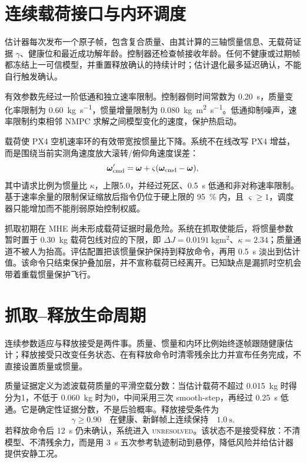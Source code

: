 \documentclass[11pt,UTF8,fontset=none]{ctexrep}
\providecommand{\dJ}{\Delta J}
\begin{document}
\section{连续载荷接口与内环调度}

估计器每次发布一个原子帧，包含复合质量、由其计算的三轴惯量信息、无载荷证据 $\gamma$、健康位和最近成功解年龄。控制器还检查帧接收年龄。任何不健康或过期帧都冻结上一可信模型，并重置释放确认的持续计时；估计退化最多延迟确认，不能自行触发确认。

有效参数先经过一阶低通和独立速率限制。控制器侧时间常数为 \SI{0.20}{\second}，质量变化率限制为 \SI{0.60}{\kg\per\second}，惯量增量限制为 \SI{0.080}{\kg\meter\squared\per\second}。低通抑制噪声，速率限制约束相邻 NMPC 求解之间模型变化的速度，保护热启动。

载荷使 PX4 空机速率环的有效带宽按惯量比下降。系统不在线改写 PX4 增益，而是围绕当前实测角速度放大滚转/俯仰角速度误差：
\begin{equation}
\bm\omega'_{\rm cmd}=\bm\omega+\varsigma(\bm\omega_{\rm cmd}-\bm\omega),
\end{equation}
其中请求比例为惯量比 $\kappa$，上限5.0，并经过死区、\SI{0.5}{\second} 低通和非对称速率限制。基于速率余量的限制保证缩放后指令仍位于硬上限的 \SI{95}{\percent} 内，且 $\varsigma\ge1$，调度器只能增加而不能削弱原始控制权威。

抓取初期在 MHE 尚未形成载荷证据时最危险。系统在抓取使能后，将惯量参数暂时置于 \SI{0.30}{\kg} 载荷包线对应的下限，即 $\dJ=\SI{0.0191}{\kg\meter\squared}$、$\kappa=2.34$；质量通道不被人为抬高。评估配置把该惯量保护保持到释放命令，再用 \SI{0.5}{\second} 淡出到估计值。该命令只结束保护叠加层，并不宣称载荷已经离开。已知缺点是漏抓时空机会带着重载惯量保护飞行。

\section{抓取--释放生命周期}

连续参数适应与释放接受是两件事。质量、惯量和内环比例始终逐帧跟随健康估计；释放接受只改变任务状态、在有释放命令时清零残余比力并宣布任务完成，不直接设置质量或惯量。

质量证据定义为滤波载荷质量的平滑空载分数：当估计载荷不超过 \SI{0.015}{\kg} 时得分为1，不低于 \SI{0.060}{\kg} 时为0，中间采用三次 smooth-step，再经过 \SI{0.25}{\second} 低通。它是确定性证据分数，不是后验概率。释放接受条件为
\begin{equation}
\gamma\ge0.90\quad\text{在健康、新鲜帧上连续保持}\quad\SI{1.0}{\second}.
\end{equation}
若释放命令后 \SI{12}{\second} 仍未确认，系统进入 \textsc{unresolved}。该状态不是接受释放：不清模型、不清残余力，而是用 \SI{3}{\second} 五次参考轨迹制动到悬停，降低风险并给估计器提供安静工况。
\end{document}
